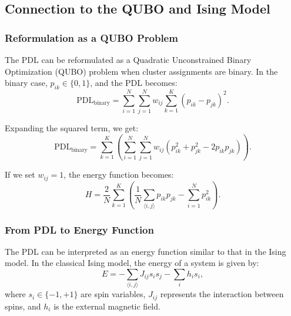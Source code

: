 \documentclass[journal]{IEEEtran}
\begin{document}
\subsection{Connection to the QUBO and Ising Model}


\subsubsection{Reformulation as a QUBO Problem}

The PDL can be reformulated as a Quadratic Unconstrained Binary Optimization (QUBO) problem when cluster assignments are binary. In the binary case, \( p_{ik} \in \{0, 1\} \), and the PDL becomes:
\begin{equation} \label{eq4}
\text{PDL}_{\text{binary}} = \sum_{i=1}^{N} \sum_{j=1}^{N} w_{ij} \sum_{k=1}^{K} (p_{ik} - p_{jk})^2.
\end{equation}

Expanding the squared term, we get:
\begin{equation} \label{eq5}
\text{PDL}_{\text{binary}} = \sum_{k=1}^{K} \left( \sum_{i=1}^{N} \sum_{j=1}^{N} w_{ij} (p_{ik}^2 + p_{jk}^2 - 2 p_{ik} p_{jk}) \right).
\end{equation}

If we set $w_{ij} = 1$, the energy function becomes:
\begin{equation} \label{eq6}
H = \frac{2}{N} \sum_{k=1}^{K} \left( \frac{1}{N} \sum_{\langle i, j \rangle} p_{ik} p_{jk} -\sum_{i=1}^{N} p_{ik}^2 \right).
\end{equation}

\subsubsection{From PDL to Energy Function}

The PDL can be interpreted as an energy function similar to that in the Ising model. In the classical Ising model, the energy of a system is given by:
\begin{equation} \label{eq7}
E = -\sum_{\langle i, j \rangle} J_{ij} s_i s_j - \sum_i h_i s_i,
\end{equation}
where \( s_i \in \{-1, +1\} \) are spin variables, \( J_{ij} \) represents the interaction between spins, and \( h_i \) is the external magnetic field.
\end{document}
